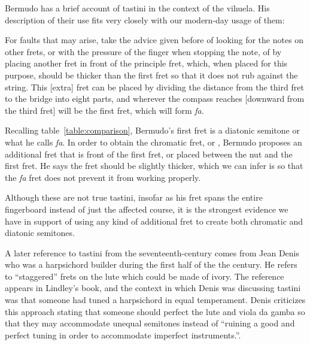 Bermudo has a brief account of tastini in the context of the vihuela.  His description
of their use fits very closely with our modern-day usage of them:
\begin{blocks}
For faults that may arise, take the advice given before of looking for the notes on other
frets, or with the pressure of the finger when stopping the note, of by placing another
fret in front of the principle fret, which, when placed for this purpose, should be
thicker than the first fret so that it does not rub against the string. This [extra]
fret can be placed by dividing the distance from the third fret to the bridge into eight
parts, and wherever the compass reaches [downward from the third fret] will be the first
fret, which will form \textit{fa}. \autocite[115-116]{DE:1}
\end{blocks}
Recalling table~\ref{table:comparison}, Bermudo's first fret is a diatonic semitone or what
he calls \textit{fa}.  In order to obtain the chromatic fret, or , Bermudo
proposes an additional fret that is front of the first fret, or placed between the nut
and the first fret.  He says the fret should be slightly thicker, which we can infer
is so that the \textit{fa} fret does not prevent it from working properly.

Although these are not true tastini, insofar as his fret spans the entire
fingerboard instead of just the affected course, it is the strongest evidence we have
in support of using any kind of additional fret to create both chromatic and diatonic semitones.

A later reference to tastini from the seventeenth-century comes from Jean Denis who
was a harpsichord builder during the first half of the the century.  He refers to
``staggered'' frets on the lute which could be made of ivory.  The reference appears in
Lindley's book, and the context in which Denis was discussing tastini was that
someone had tuned a harpsichord in equal temperament.  Denis criticizes this approach
stating that someone should perfect the lute and viola da gamba so that they may
accommodate unequal semitones instead of ``ruining a good and perfect tuning in order to
accommodate imperfect instruments.''\autocite[47]{ML:1}.

